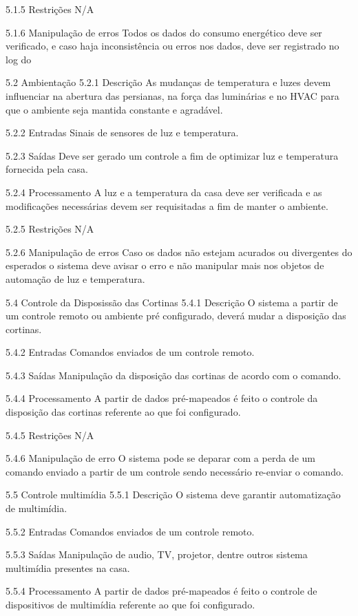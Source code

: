 5.1.5 Restrições
N/A

5.1.6 Manipulação de erros
Todos os dados do consumo energético deve ser verificado, e caso haja inconsistência ou erros nos dados, deve ser registrado no log do



5.2 Ambientação
5.2.1 Descrição
As mudanças de temperatura e luzes devem influenciar na abertura das persianas, na força das luminárias e no HVAC para que o ambiente seja mantida constante e agradável.

5.2.2 Entradas
Sinais de sensores de luz e temperatura.

5.2.3 Saídas
Deve ser gerado um controle a fim de optimizar luz e temperatura fornecida pela casa.

5.2.4 Processamento
A luz e a temperatura da casa deve ser verificada e as modificações necessárias devem ser requisitadas a fim de manter o ambiente.

5.2.5 Restrições
N/A

5.2.6 Manipulação de erros
Caso os dados não estejam acurados ou divergentes do esperados o sistema deve avisar o erro e não manipular mais nos objetos de automação de luz e temperatura.

5.4 Controle da Disposissão das Cortinas
5.4.1 Descrição
 O sistema a partir de um controle remoto ou ambiente pré configurado, deverá mudar a disposição das cortinas.

5.4.2 Entradas
    Comandos enviados de um controle remoto.

5.4.3 Saídas
    Manipulação da disposição das cortinas de acordo com o comando.

5.4.4 Processamento
    A partir de dados pré-mapeados é feito o controle da disposição das cortinas referente ao que foi configurado.

5.4.5 Restrições
N/A

5.4.6 Manipulação de erro
    O sistema pode se deparar com a perda de um comando enviado a partir de um controle sendo necessário re-enviar o comando.


5.5 Controle multimídia
5.5.1 Descrição
 O sistema deve garantir automatização de multimídia.

5.5.2 Entradas
    Comandos enviados de um controle remoto.

5.5.3 Saídas
    Manipulação de audio, TV, projetor, dentre outros sistema multimídia presentes na casa.

5.5.4 Processamento
    A partir de dados pré-mapeados é feito o controle de dispositivos de multimídia referente ao que foi configurado.

